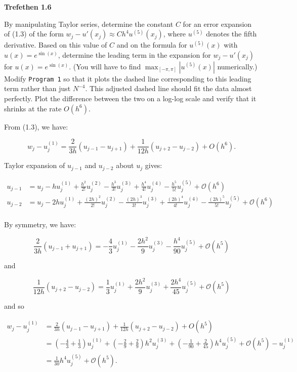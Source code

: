 \textbf{Trefethen 1.6}

By manipulating Taylor series, determine the constant $C$ for an error expansion of (1.3) of the form
$w_j - u'(x_j) \approx Ch^4 u^{(5)}(x_j)$, where $u^{(5)}$ denotes the fifth derivative. Based on this
value of $C$ and on the formula for $u^{(5)}(x)$ with $u(x) = e^{\sin{(x)}}$, determine the leading term
in the expansion for $w_j - u'(x_j)$ for $u(x) = e^{\sin{(x)}}$. (You will have to find 
$\max_{[-\pi, \pi]}{\left\vert u^{(5)}(x) \right\vert}$ numerically.) Modify \texttt{Program 1} so that
it plots the dashed line corresponding to this leading term rather than just $N^{-4}$. This adjusted
dashed line should fit the data almost perfectly. Plot the difference between the two on a log-log scale
and verify that it shrinks at the rate $O(h^6)$.


\begin{solution}
  From (1.3), we have:
  
  $$
    w_j - u_j^{(1)} = \frac{2}{3h}\left( u_{j-1} - u_{j+1}\right) + \frac{1}{12h}\left(u_{j+2} - u_{j-2} \right) + O(h^6).
  $$

  Taylor expansion of $u_{j-1}$ and $u_{j-2}$ about $u_j$ gives:

  \begin{align*}
    u_{j-1} &= u_j - h u_j^{(1)} + \frac{h^2}{2!} u_j^{(2)} - \frac{h^3}{3!} u_j^{(3)} + \frac{h^4}{4!} u_j^{(4)} - \frac{h^5}{5!} u_j^{(5)} + \mathcal{O}(h^6) \\
    u_{j-2} &= u_j - 2h u_j^{(1)} + \frac{(2h)^2}{2!} u_j^{(2)} - \frac{(2h)^3}{3!} u_j^{(3)} + \frac{(2h)^4}{4!} u_j^{(4)} - \frac{(2h)^5}{5!} u_j^{(5)} + \mathcal{O}(h^6) \\
  \end{align*}

  By symmetry, we have:

  $$
  \frac{2}{3h}\left(u_{j-1} + u_{j+1} \right) = -\frac{4}{3} u_j^{(1)} - \frac{2h^2}{9} u_j^{(3)} - \frac{h^4}{90} u_j^{(5)} + \mathcal{O}(h^5)
  $$

  and 

  $$
  \frac{1}{12h} \left(u_{j+2} - u_{j-2} \right) = \frac{1}{3} u_j^{(1)} + \frac{2h^2}{9} u_j^{(3)} + \frac{2h^4}{45} u_j^{(5)} + \mathcal{O}(h^5)
  $$

  and so 

  \begin{align*}
    w_j - u_j^{(1)} &= \frac{2}{3h}\left( u_{j-1} - u_{j+1}\right) + \frac{1}{12h}\left(u_{j+2} - u_{j-2} \right) + O(h^5) \\
                       &= \left( -\frac{4}{3} + \frac{1}{3} \right) u_j^{(1)} 
                        + \left( -\frac{2}{9} + \frac{2}{9} \right) h^2 u_j^{(3)}
                        + \left( -\frac{1}{90} + \frac{2}{45} \right) h^4 u_j^{(5)} + \mathcal{O}(h^5) - u_j^{(1)} \\
                       &= \frac{1}{30} h^4 u_j^{(5)} + \mathcal{O}(h^5). \\
  \end{align*}


\end{solution}
